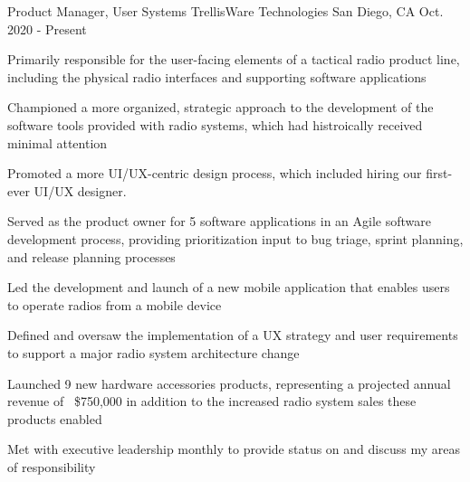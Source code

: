 

\begin{cventries}

  \cventry
    {Product Manager, User Systems}
    {TrellisWare Technologies}
    {San Diego, CA}
    {Oct. 2020 - Present}
    {
      \begin{cvitems}
        \item {Primarily responsible for the user-facing elements of a tactical radio product line, including the physical radio interfaces and supporting software applications} 
        \item {Championed a more organized, strategic approach to the development of the software tools provided with radio systems, which had histroically received minimal attention}
        \item {Promoted a more UI/UX-centric design process, which included hiring our first-ever UI/UX designer.}
        \item {Served as the product owner for 5 software applications in an Agile software development process, providing prioritization input to bug triage, sprint planning, and release planning processes}
        \item {Led the development and launch of a new mobile application that enables users to operate radios from a mobile device}
        \item {Defined and oversaw the implementation of a UX strategy and user requirements to support a major radio system architecture change}
        \item {Launched 9 new hardware accessories products, representing a projected annual revenue of ~\$750,000 in addition to the increased radio system sales these products enabled}
        \item {Met with executive leadership monthly to provide status on and discuss my areas of responsibility}
      \end{cvitems}
    }


\end{cventries}
